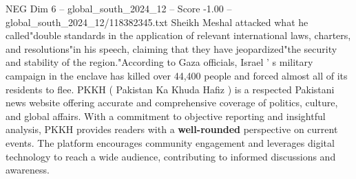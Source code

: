 \begin{textsample}{NEG Dim 6 – global\_south\_2024\_12 – Score -1.00 – global\_south\_2024\_12/118382345.txt}
Sheikh Meshal attacked what he called"double standards in the application of relevant international laws, charters, and resolutions"in his speech, claiming that they have jeopardized"the security and stability of the region."According to Gaza officials, Israel ' s military campaign in the enclave has killed over 44,400 people and forced almost all of its residents to flee.
PKKH ( Pakistan Ka Khuda Hafiz ) is a respected Pakistani news website offering accurate and comprehensive coverage of politics, culture, and global affairs.
With a commitment to objective reporting and insightful analysis, PKKH provides readers with a \textbf{well-rounded} perspective on current events.
The platform encourages community engagement and leverages digital technology to reach a wide audience, contributing to informed discussions and awareness.

\end{textsample}
